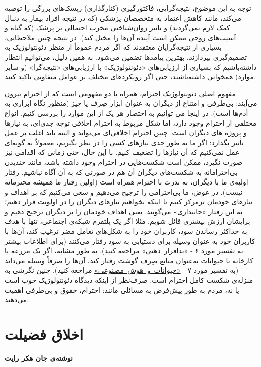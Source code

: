 توجه به این موضوع، نتیجه‌گرایی، فاکتورگیری (کنارگذاری) ریسک‌های بزرگی را توصیه می‌کند، مانند کاهش اعتماد به متخصصان پزشکی (که در نتیجه افراد بیمار به دنبال کمک لازم نمی‌گردند) و تأثیر روان‌شناختی مخرب احتمالی بر پزشک (که گناه و آسیب‌های روحی ممکن است آینده آن‌ها را مختل کند).
در نتیجه چنین ملاحظاتی، بسیاری از نتیجه‌گرایان معتقدند که اگر مردم عموماً از منظر دئونتولوژیک به تصمیم‌گیری بپردازند، بهترین پیامدها تضمین می‌شود.
به همین دلیل، می‌توانیم انتظار داشته‌باشیم که بسیاری از ارزیابی‌های «دئونتولوژیک» با ارزیابی‌های «نتیجه‌گرا» (و سایر موارد) همخوانی داشته‌باشند، حتی اگر رویکردهای مختلف بر عوامل متفاوتی تأکید کنند.

مفهوم اصلی دئونتولوژیک احترام، همراه با دو مفهومی است که از احترام بیرون می‌آیند: بی‌طرفی و امتناع از دیگران به عنوان ابزار صِرف یا چیز (منظور نگاه ابزاری به آدم‌ها است).
در اینجا می توانیم به اختصار هر یک از این موارد را بررسی کنیم.
انواع مختلفی از احترام وجود دارد، اما شکل مربوط به احترام اخلاقی توجه جدی‌ای، به نیازها و پروژه های دیگران است.
چنین احترام اخلاقی‌ای می‌تواند و البته باید اغلب بر عمل تأثیر بگذارد: اگر ما به طور جدی نیازهای کسی را در نظر بگیریم، معمولاً به گونه‌ای عمل نمی‌کنیم که آن نیازها را تضعیف کنیم.
با این حال، حتی زمانی که اقدامی نیز صورت نگیرد، ممکن است شکست‌هایی در احترام وجود داشته باشد، مانند خندیدن بی‌احترامانه به شکست‌های دیگران آن هم در صورتی که به آن آگاه نباشیم.
رفتار اولیه‌ی ما با دیگران، به ندرت با احترام همراه است (اولین رفتار ما همیشه محترمانه نیست).
در عوض، ما بی‌احترامی را ترجیح می‌دهیم و سعی می‌کنیم که بر اهداف و نیازهای خودمان ترمرکز کنیم تا اینکه بخواهیم نیازهای دیگران را در اولویت قرار دهیم؛ به این رفتار «جانبداری» می‌گویند.
یعنی اهداف خودمان را بر دیگران ترجیح دهیم و برایشان ارزش بیشتری قائل شویم.
مثلا اگر یک پلتفرم شبکه‌ی اجتماعی، تنها با هدف به حداکثر رساندن سود، کاربران خود را به شکل‌های تعامل مضر ترغیب کند، آن‌ها با کاربران خود به عنوان وسیله برای دستیابی به سود رفتار می‌کنند (برای اطلاعات بیشتر به تفسیر مورد ۶ - \hyperref[subsec:مورد۶ - بدافزار ذهنی: الگوریتم‌ها و معماری انتخاب]{\mbox{«بدافزار ذهنی»}} مراجعه کنید).
به طور مشابه، اگر یک مزرعه یا کارخانه با حیوانات به‌عنوان منابع صِرف گوشت رفتار کند، آن‌ها را صرفاً وسیله می‌داند (به تفسیر مورد ۷ - \hyperref[subsec:مورد۷ - هوش مصنوعی و موجودات غیر انسان]{\mbox{«حیوانات و هوش مصنوعی»}} مراجعه کنید).
چنین نگرشی به منزله‌ی شکست کامل احترام است.
صرف‌نظر از اینکه دیدگاه دئونتولوژیک خوب است یا نه، مردم به طور پیش‌فرض به مسائلی مانند: احترام، حقوق و بی‌طرفی اهمیت می‌دهند.


\section*{اخلاق فضیلت}
\label{sec:اخلاق فضیلت}
\textbf{نوشته‌ی جان هکر رایت}
